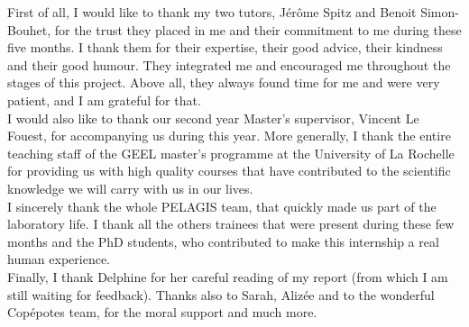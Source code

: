 
First of all, I would like to thank my two tutors, Jérôme Spitz and Benoit Simon-Bouhet, for the trust they placed in me and their commitment to me during these five months. I thank them for their expertise, their good advice, their kindness and their good humour. They integrated me and encouraged me throughout the stages of this project. Above all, they always found time for me and were very patient, and I am grateful for that. \\

I would also like to thank our second year Master's supervisor, Vincent Le Fouest, for accompanying us during this year. More generally, I thank the entire teaching staff of the GEEL master's programme at the University of La Rochelle for providing us with high quality courses that have contributed to the scientific knowledge we will carry with us in our lives. \\

I sincerely thank the whole PELAGIS team, that quickly made us part of the laboratory life. I thank all the others trainees that were present during these few months and the PhD students, who contributed to make this internship a real human experience. \\

Finally, I thank Delphine for her careful reading of my report (from which I am still waiting for feedback). Thanks also to Sarah, Alizée and to the wonderful Copépotes team, for the moral support and much more.